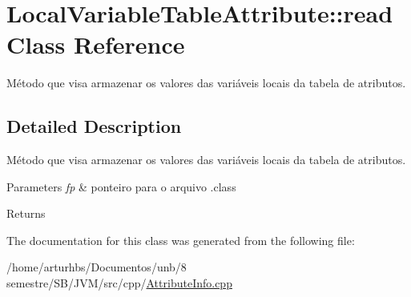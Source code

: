 \hypertarget{classLocalVariableTableAttribute_1_1read}{}\section{Local\+Variable\+Table\+Attribute\+:\+:read Class Reference}
\label{classLocalVariableTableAttribute_1_1read}


Método que visa armazenar os valores das variáveis locais da tabela de atributos.  




\subsection{Detailed Description}
Método que visa armazenar os valores das variáveis locais da tabela de atributos. 


\begin{DoxyParams}{Parameters}
{\em fp} & ponteiro para o arquivo .class \\
\hline
\end{DoxyParams}
\begin{DoxyReturn}{Returns}

\end{DoxyReturn}


The documentation for this class was generated from the following file\+:\begin{DoxyCompactItemize}
\item 
/home/arturhbs/\+Documentos/unb/8 semestre/\+S\+B/\+J\+V\+M/src/cpp/\hyperlink{AttributeInfo_8cpp}{Attribute\+Info.\+cpp}\end{DoxyCompactItemize}

